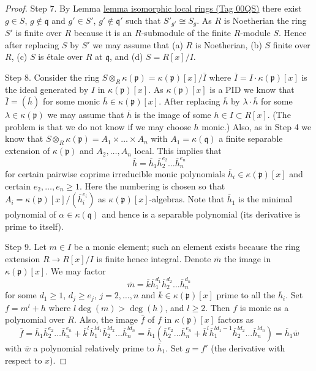\documentclass{amsart}
\theoremstyle{plain}
\theoremstyle{definition}
\theoremstyle{remark}
\numberwithin{equation}{subsection}
\begin{document}
\begin{proof}
\medskip\noindent
Step 7. By Lemma \href{https://stacks.math.columbia.edu/tag/00QS}{lemma isomorphic local rings (Tag 00QS)} there exist
$g \in S$, $g \not \in \mathfrak q$ and $g' \in S'$, $g' \not \in \mathfrak q'$
such that $S'_{g'} \cong S_g$. As $R$ is Noetherian the ring $S'$ is finite
over $R$ because it is an $R$-submodule
of the finite $R$-module $S$. Hence after replacing $S$ by $S'$ we may
assume that (a) $R$ is Noetherian, (b) $S$ finite over $R$, (c)
$S$ is \'etale over $R$ at $\mathfrak q$, and (d) $S = R[x]/I$.

\medskip\noindent
Step 8. Consider the ring
$S \otimes_R \kappa(\mathfrak p) = \kappa(\mathfrak p)[x]/\overline{I}$
where $\overline{I} = I \cdot \kappa(\mathfrak p)[x]$ is the ideal generated
by $I$ in $\kappa(\mathfrak p)[x]$. As $\kappa(\mathfrak p)[x]$ is a PID
we know that $\overline{I} = (\overline{h})$ for some monic
$\overline{h} \in \kappa(\mathfrak p)[x]$. After replacing $\overline{h}$
by $\lambda \cdot \overline{h}$ for some $\lambda \in \kappa(\mathfrak p)$
we may assume that $\overline{h}$ is the image of some $h \in I \subset R[x]$.
(The problem is that we do not know if we may choose $h$ monic.)
Also, as in Step 4 we know that
$S \otimes_R \kappa(\mathfrak p) = A_1 \times \ldots \times A_n$ with
$A_1 = \kappa(\mathfrak q)$ a finite separable extension of
$\kappa(\mathfrak p)$ and $A_2, \ldots, A_n$ local. This implies
that
$$
\overline{h} = \overline{h}_1 \overline{h}_2^{e_2} \ldots \overline{h}_n^{e_n}
$$
for certain pairwise coprime irreducible monic polynomials
$\overline{h}_i \in \kappa(\mathfrak p)[x]$ and certain
$e_2, \ldots, e_n \geq 1$. Here the numbering is chosen so that
$A_i = \kappa(\mathfrak p)[x]/(\overline{h}_i^{e_i})$ as
$\kappa(\mathfrak p)[x]$-algebras. Note that $\overline{h}_1$ is
the minimal polynomial of $\alpha \in \kappa(\mathfrak q)$ and hence
is a separable polynomial (its derivative is prime to itself).

\medskip\noindent
Step 9. Let $m \in I$ be a monic element; such an element exists
because the ring extension $R \to R[x]/I$ is finite hence integral.
Denote $\overline{m}$ the image in $\kappa(\mathfrak p)[x]$.
We may factor
$$
\overline{m} = \overline{k}
\overline{h}_1^{d_1} \overline{h}_2^{d_2} \ldots \overline{h}_n^{d_n}
$$
for some $d_1 \geq 1$, $d_j \geq e_j$, $j = 2, \ldots, n$ and
$\overline{k} \in \kappa(\mathfrak p)[x]$ prime to all the $\overline{h}_i$.
Set $f = m^l + h$ where $l \deg(m) > \deg(h)$, and $l \geq 2$.
Then $f$ is monic as a polynomial over $R$. Also, the image $\overline{f}$
of $f$ in $\kappa(\mathfrak p)[x]$ factors as
$$
\overline{f} =
\overline{h}_1 \overline{h}_2^{e_2} \ldots \overline{h}_n^{e_n}
+
\overline{k}^l \overline{h}_1^{ld_1} \overline{h}_2^{ld_2}
\ldots \overline{h}_n^{ld_n}
=
\overline{h}_1(\overline{h}_2^{e_2} \ldots \overline{h}_n^{e_n}
+
\overline{k}^l
\overline{h}_1^{ld_1 - 1} \overline{h}_2^{ld_2} \ldots \overline{h}_n^{ld_n})
= \overline{h}_1 \overline{w}
$$
with $\overline{w}$ a polynomial relatively prime to $\overline{h}_1$.
Set $g = f'$ (the derivative with respect to $x$).


\end{proof}
\end{document}
